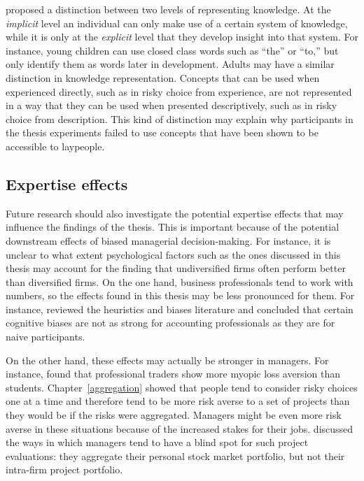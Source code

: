 \documentclass[a4paper, nobind, dvipsnames]{templates/ociamthesis}
\theoremstyle{definition}
\theoremstyle{definition}
\theoremstyle{definition}
\theoremstyle{definition}
\theoremstyle{remark}
\begin{document}
\textcite{clark1993} proposed a distinction between two levels of representing knowledge.
At the \emph{implicit} level an individual can only make use of a certain system of
knowledge, while it is only at the \emph{explicit} level that they develop insight
into that system. For instance, young children can use closed class words such
as ``the'' or ``to,'' but only identify them as words later in development. Adults
may have a similar distinction in knowledge representation. Concepts that can be
used when experienced directly, such as in risky choice from experience, are not
represented in a way that they can be used when presented descriptively, such as
in risky choice from description. This kind of distinction may explain why
participants in the thesis experiments failed to use concepts that have been
shown to be accessible to laypeople.

\subsection{Expertise effects}

Future research should also investigate the potential expertise effects that may
influence the findings of the thesis. This is important because of the potential
downstream effects of biased managerial decision-making. For instance, it is
unclear to what extent psychological factors such as the ones discussed in this
thesis may account for the finding that undiversified firms often perform better
than diversified firms. On the one hand, business professionals tend to work
with numbers, so the effects found in this thesis may be less pronounced for
them. For instance, \textcite{smith1991} reviewed the heuristics and biases literature and
concluded that certain cognitive biases are not as strong for accounting
professionals as they are for naive participants.

On the other hand, these effects may actually be stronger in managers. For
instance, \textcite{haigh2005} found that professional traders show more myopic loss
aversion than students. Chapter~\ref{aggregation} showed that people tend to
consider risky choices one at a time and therefore tend to be more risk averse
to a set of projects than they would be if the risks were aggregated. Managers
might be even more risk averse in these situations because of the increased
stakes for their jobs. \textcite{lovallo2020} discussed the ways in which managers tend to
have a blind spot for such project evaluations: they aggregate their personal
stock market portfolio, but not their intra-firm project portfolio.
\end{document}
